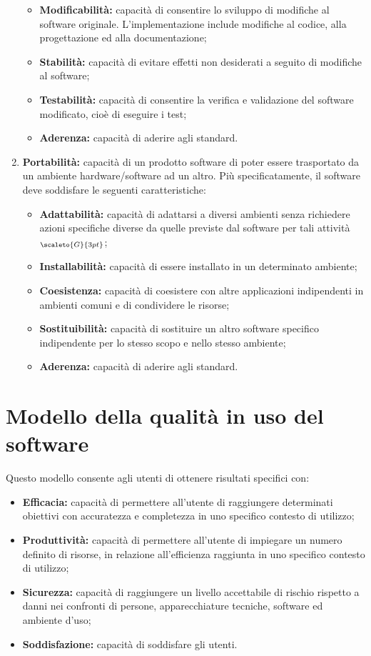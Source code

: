 \begin{enumerate}
\begin{itemize}
 		\item \textbf{Modificabilità:} capacità di consentire lo sviluppo di modifiche al software originale. L’implementazione include modifiche al codice, alla progettazione ed alla documentazione;
 		\item \textbf{Stabilità:} capacità di evitare effetti non desiderati a seguito di modifiche al software;
 		\item \textbf{Testabilità:} capacità di consentire la verifica e validazione del software modificato, cioè di eseguire i test;
 		\item \textbf{Aderenza:} capacità di aderire agli standard.
 	\end{itemize}
	\item \textbf{Portabilità:} capacità di un prodotto software di poter essere trasportato da un ambiente hardware/software ad un altro. Più specificatamente, il software deve soddisfare le seguenti caratteristiche:
	\begin{itemize}
		\item \textbf{Adattabilità:} capacità di adattarsi a diversi ambienti senza richiedere azioni specifiche diverse da quelle previste dal software per tali attività$_{\scaleto{G}{3pt}}$;
		\item \textbf{Installabilità:} capacità di essere installato in un determinato ambiente;
		\item \textbf{Coesistenza:} capacità di coesistere con altre applicazioni indipendenti in ambienti comuni e di condividere le risorse;
		\item \textbf{Sostituibilità:} capacità di sostituire un altro software specifico indipendente per lo stesso scopo e nello stesso ambiente;
		\item \textbf{Aderenza:} capacità di aderire agli standard.
	\end{itemize}
\end{enumerate}

\section{Modello della qualità in uso del software}\label{StandardISO/IEC9126ModelloDellaQualitàInUsoDelSoftware}
Questo modello consente agli utenti di ottenere risultati specifici con:
\begin{itemize}
	\item \textbf{Efficacia:} capacità di permettere all'utente di raggiungere determinati obiettivi con accuratezza e completezza in uno specifico contesto di utilizzo;
	\item \textbf{Produttività:} capacità di permettere all'utente di impiegare un numero definito di risorse, in relazione all'efficienza raggiunta in uno specifico contesto di utilizzo;
	\item \textbf{Sicurezza:} capacità di raggiungere un livello accettabile di rischio rispetto a danni nei confronti di persone, apparecchiature tecniche, software ed ambiente d’uso;
	\item \textbf{Soddisfazione:} capacità di soddisfare gli utenti.
\end{itemize}